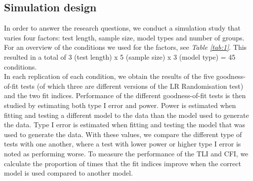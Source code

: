 \documentclass[Royal,sageapa,times,doublespace]{sagej}
\begin{document}
\subsection{Simulation design}
In order to answer the research questions, we conduct a simulation study that varies four factors: test length, sample size, model types and number of groups. For an overview of the conditions we used for the factors, see \textit{Table \ref{tab:1}}. This resulted in a total of 3 (test length) x 5 (sample size) x 3 (model type) = 45 conditions. \\
\indent In each replication of each condition, we obtain the results of the five goodness-of-fit tests (of which three are different versions of the LR Randomisation test) and the two fit indices. Performance of the different goodness-of-fit tests is then studied by estimating both type I error and power. Power is estimated when fitting and testing a different model to the data than the model used to generate the data. Type I error is estimated when fitting and testing the model that was used to generate the data. With these values, we compare the different type of tests with one another, where a test with lower power or higher type I error is noted as performing worse.
To measure the performance of the TLI and CFI, we calculate the proportion of times that the fit indices improve when the correct model is used compared to another model.
\end{document}
